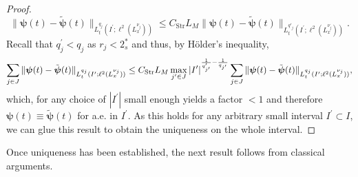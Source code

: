 \documentclass[12pt,a4paper]{amsart}
\numberwithin{equation}{section}
\newcommand{\ulpsi}{\boldsymbol{\psi}}
\newcommand{\twoasts}{{2^*_s}}
\newcommand{\Clip}[1]{L_{#1}}
\begin{document}
\begin{proof}
		\begin{equation}
			\| \ulpsi(t) - \tilde{\ulpsi}(t) \|_{L^{q_{j}}_t(I^\prime;\ell^2(L^{\nu_{j}}_x))} \leq  C_{\mathrm{Str}} L_M \| \ulpsi(t) - \tilde{\ulpsi}(t) \|_{L_t^{q'_j}(I^\prime;\ell^2(L_x^{\nu_j}))} .
		\end{equation}
		Recall that $q_j^\prime < q_j$ as $ r_j < \twoasts  $ and thus, by H\"older's inequality, 
		\begin{equation}
			\sum_{j\in J} \| \ulpsi(t) - \tilde{\ulpsi}(t) \|_{L^{q_{j}}_t(I^\prime;\ell^2(L^{\nu_{j}}_x))} \\ 
			\leq C_{\mathrm{Str}} \Clip{M}
			\max_{j'\in J}|I^\prime|^{\frac{1}{q'_{j'}}-\frac{1}{q_{j'}}}
			\sum_{j\in J}     \| \ulpsi(t) - \tilde{\ulpsi}(t) \|_{L^{q_{j}}_t(I^\prime;\ell^2(L^{\nu_{j}}_x))} ,
		\end{equation}
		which, for any choice of $|I^\prime|$ small enough yields a factor $<1$ and therefore $\ulpsi(t) \equiv \tilde{\ulpsi}(t) $ for a.e. in $I^\prime$. As this holds for any arbitrary small interval $I^\prime \subset I$, we can glue this result to obtain the uniqueness on the whole interval.
	\end{proof}
	
	Once uniqueness has been established, the next result follows from classical arguments.
	
\end{document}

